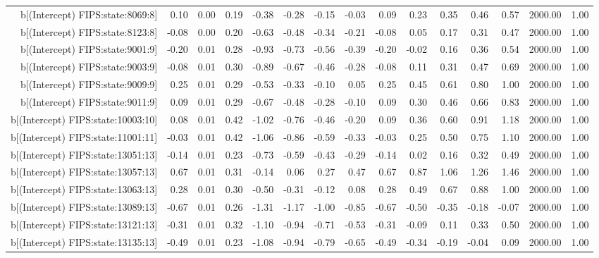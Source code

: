 \begin{table}[ht]
\begin{tabular}{rrrrrrrrrrrrrrr}
  b[(Intercept) FIPS:state:8069:8] & 0.10 & 0.00 & 0.19 & -0.38 & -0.28 & -0.15 & -0.03 & 0.09 & 0.23 & 0.35 & 0.46 & 0.57 & 2000.00 & 1.00 \\ 
  b[(Intercept) FIPS:state:8123:8] & -0.08 & 0.00 & 0.20 & -0.63 & -0.48 & -0.34 & -0.21 & -0.08 & 0.05 & 0.17 & 0.31 & 0.47 & 2000.00 & 1.00 \\ 
  b[(Intercept) FIPS:state:9001:9] & -0.20 & 0.01 & 0.28 & -0.93 & -0.73 & -0.56 & -0.39 & -0.20 & -0.02 & 0.16 & 0.36 & 0.54 & 2000.00 & 1.00 \\ 
  b[(Intercept) FIPS:state:9003:9] & -0.08 & 0.01 & 0.30 & -0.89 & -0.67 & -0.46 & -0.28 & -0.08 & 0.11 & 0.31 & 0.47 & 0.69 & 2000.00 & 1.00 \\ 
  b[(Intercept) FIPS:state:9009:9] & 0.25 & 0.01 & 0.29 & -0.53 & -0.33 & -0.10 & 0.05 & 0.25 & 0.45 & 0.61 & 0.80 & 1.00 & 2000.00 & 1.00 \\ 
  b[(Intercept) FIPS:state:9011:9] & 0.09 & 0.01 & 0.29 & -0.67 & -0.48 & -0.28 & -0.10 & 0.09 & 0.30 & 0.46 & 0.66 & 0.83 & 2000.00 & 1.00 \\ 
  b[(Intercept) FIPS:state:10003:10] & 0.08 & 0.01 & 0.42 & -1.02 & -0.76 & -0.46 & -0.20 & 0.09 & 0.36 & 0.60 & 0.91 & 1.18 & 2000.00 & 1.00 \\ 
  b[(Intercept) FIPS:state:11001:11] & -0.03 & 0.01 & 0.42 & -1.06 & -0.86 & -0.59 & -0.33 & -0.03 & 0.25 & 0.50 & 0.75 & 1.10 & 2000.00 & 1.00 \\ 
  b[(Intercept) FIPS:state:13051:13] & -0.14 & 0.01 & 0.23 & -0.73 & -0.59 & -0.43 & -0.29 & -0.14 & 0.02 & 0.16 & 0.32 & 0.49 & 2000.00 & 1.00 \\ 
  b[(Intercept) FIPS:state:13057:13] & 0.67 & 0.01 & 0.31 & -0.14 & 0.06 & 0.27 & 0.47 & 0.67 & 0.87 & 1.06 & 1.26 & 1.46 & 2000.00 & 1.00 \\ 
  b[(Intercept) FIPS:state:13063:13] & 0.28 & 0.01 & 0.30 & -0.50 & -0.31 & -0.12 & 0.08 & 0.28 & 0.49 & 0.67 & 0.88 & 1.00 & 2000.00 & 1.00 \\ 
  b[(Intercept) FIPS:state:13089:13] & -0.67 & 0.01 & 0.26 & -1.31 & -1.17 & -1.00 & -0.85 & -0.67 & -0.50 & -0.35 & -0.18 & -0.07 & 2000.00 & 1.00 \\ 
  b[(Intercept) FIPS:state:13121:13] & -0.31 & 0.01 & 0.32 & -1.10 & -0.94 & -0.71 & -0.53 & -0.31 & -0.09 & 0.11 & 0.33 & 0.50 & 2000.00 & 1.00 \\ 
  b[(Intercept) FIPS:state:13135:13] & -0.49 & 0.01 & 0.23 & -1.08 & -0.94 & -0.79 & -0.65 & -0.49 & -0.34 & -0.19 & -0.04 & 0.09 & 2000.00 & 1.00 \\ 

\end{tabular}
\end{table}
